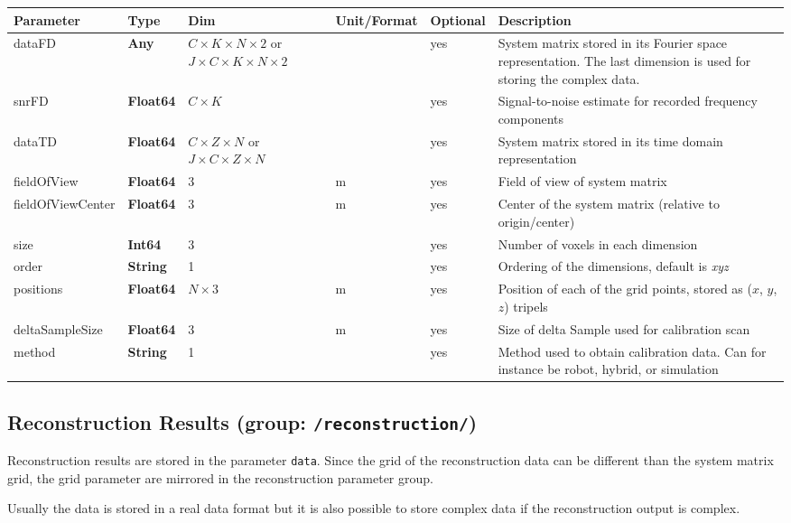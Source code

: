 \documentclass[landscape]{article} %
\newcommand{\inl}[1]{\lstinline[columns=fixed]{#1}}
\newcommand{\inltab}[1]{{\ttfamily\bfseries\color{blue}#1}}
\newcommand{\inlvar}[1]{{\ttfamily#1}}
\begin{document}
\noindent \begin{tabularx}{\columnwidth}{llp{3cm}llX} 
\textbf{Parameter} & \textbf{Type} & \textbf{Dim} & \textbf{Unit/Format} & \textbf{Optional} & \textbf{Description} \\ \hline 
\inlvar{dataFD} & \inltab{Any} & $C \times K \times N \times 2$ or \newline $J \times C \times K \times N \times 2$ & & yes & System matrix stored in its Fourier space representation. The last dimension is used for storing the complex data. \\ \hline
\inlvar{snrFD} & \inltab{Float64} & $C \times K$ &  & yes & Signal-to-noise estimate for recorded frequency components \\ \hline
\inlvar{dataTD} & \inltab{Float64} &  $C \times Z \times N$ or \newline $J \times C \times Z \times N$ & & yes & System matrix stored in its time domain representation \\ \hline 
\inlvar{fieldOfView} & \inltab{Float64} & $3$ & m & yes & Field of view of system matrix \\ \hline
\inlvar{fieldOfViewCenter} & \inltab{Float64} & $3$ & m & yes & Center of the system matrix (relative to origin/center) \\ \hline
\inlvar{size} & \inltab{Int64} & $3$ &  & yes & Number of voxels in each dimension \\ \hline
\inlvar{order} & \inltab{String} & 1 & & yes & Ordering of the dimensions, default is \textit{xyz} \\ \hline
\inlvar{positions} & \inltab{Float64} & $N \times 3$ & m & yes & Position of each of the grid points, stored as ($x$, $y$, $z$) tripels \\ \hline
\inlvar{deltaSampleSize} & \inltab{Float64} & 3 & m & yes & Size of delta Sample used for calibration scan \\ \hline
\inlvar{method} & \inltab{String} & 1 & & yes & Method used to obtain calibration data. Can for instance be robot, hybrid, or simulation \\ \hline
\end{tabularx}


\subsection{Reconstruction Results (group: \inl{/reconstruction/})}

\begin{multicols}{2}

Reconstruction results are stored in the parameter \inl{data}. Since the grid of the reconstruction data can be different than the system matrix grid, the grid parameter are mirrored in the reconstruction parameter group. 

Usually the data is stored in a real data format but it is also possible to store complex data if the reconstruction output is complex.\newline

\end{multicols}
\end{document}
